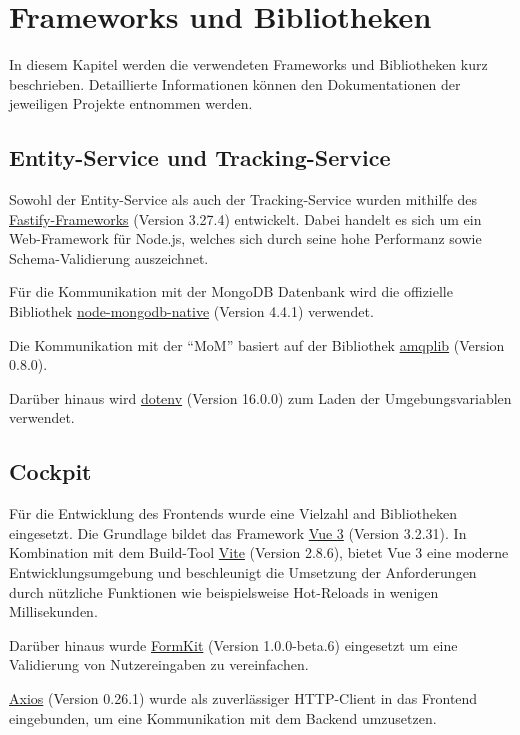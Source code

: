 \section{Frameworks und Bibliotheken}

In diesem Kapitel werden die verwendeten Frameworks und Bibliotheken kurz beschrieben.
Detaillierte Informationen können den Dokumentationen der jeweiligen Projekte entnommen werden.

\subsection{Entity-Service und Tracking-Service}

Sowohl der Entity-Service als auch der Tracking-Service wurden mithilfe des \href{https://www.fastify.io}{Fastify-Frameworks} (Version 3.27.4) entwickelt.
Dabei handelt es sich um ein Web-Framework für Node.js, welches sich durch seine hohe Performanz sowie Schema-Vali\-dierung auszeichnet.

Für die Kommunikation mit der MongoDB Datenbank wird die offizielle Bibliothek \href{https://github.com/mongodb/node-mongodb-native}{node-mongodb-native} (Version 4.4.1) verwendet.

Die Kommunikation mit der \enquote{MoM} basiert auf der Bibliothek \href{https://amqp-node.github.io/amqplib/}{amqplib} (Version 0.8.0).

Darüber hinaus wird \href{https://github.com/motdotla/dotenv}{dotenv} (Version 16.0.0) zum Laden der Umgebungsvariablen verwendet.

\subsection{Cockpit}

Für die Entwicklung des Frontends wurde eine Vielzahl and Bibliotheken eingesetzt.
Die Grundlage bildet das Framework \href{https://vuejs.org}{Vue 3} (Version 3.2.31).
In Kombination mit dem Build-Tool \href{https://vitejs.dev}{Vite} (Version 2.8.6), bietet Vue 3 eine moderne Entwicklungsumgebung und beschleunigt die Umsetzung der Anforderungen durch nützliche Funktionen wie beispielsweise Hot-Reloads in wenigen Millisekunden.

Darüber hinaus wurde \href{https://formkit.com}{FormKit} (Version 1.0.0-beta.6) eingesetzt um eine Validierung von Nutzereingaben zu vereinfachen.

\href{https://github.com/axios/axios}{Axios} (Version 0.26.1) wurde als zuverlässiger HTTP-Client in das Frontend eingebunden, um eine Kommunikation mit dem Backend umzusetzen.

